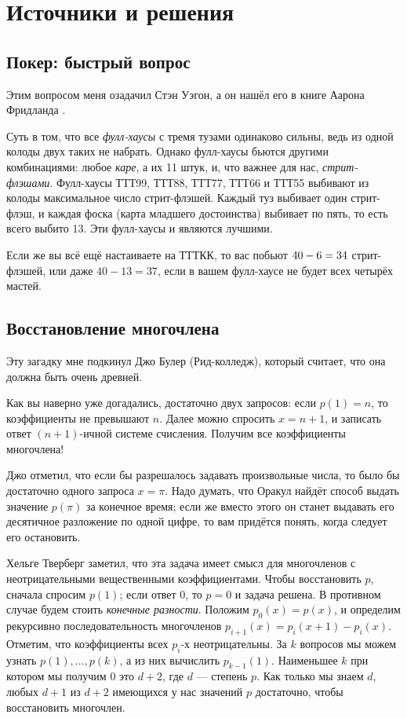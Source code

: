 \section*{Источники и решения}

\subsection*{Покер: быстрый вопрос}

Этим вопросом меня озадачил Стэн Уэгон, а он нашёл его в книге Аарона Фридланда \cite{friedland}.

Суть в том, что все \emph{фулл-хаусы} с тремя тузами одинаково сильны, ведь из одной колоды двух таких не набрать.
Однако фулл-хаусы бьются другими комбинациями: любое \emph{каре}, а их 11 штук, и, что важнее для нас, \emph{стрит-флэшами}.
Фулл-хаусы ТТТ99, ТТТ88, ТТТ77, ТТТ66 и ТТТ55 выбивают из колоды максимальное число стрит-флэшей.
Каждый туз выбивает один стрит-флэш, и каждая фоска (карта младшего достоинства) выбивает по пять, то есть всего выбито 13.
Эти фулл-хаусы и являются лучшими.

Если же вы всё ещё настаиваете на ТТТКК, то вас побьют $40 - 6 \z= 34$ стрит-флэшей, или даже $40 - 13 = 37$, если в вашем фулл-хаусе не будет всех четырёх мастей.

\subsection*{Восстановление многочлена}

Эту загадку мне подкинул Джо Булер (Рид-колледж), который считает, что она должна быть очень древней.

Как вы наверно уже догадались, достаточно двух запросов:
если $p(1)=n$, то коэффициенты не превышают $n$.
Далее можно спросить $x = n + 1$, и записать ответ $(n + 1)$-ичной системе счисления.
Получим все коэффициенты многочлена!

Джо отметил, что если бы разрешалось задавать произвольные числа, то было бы достаточно одного запроса $x = \pi$.
Надо думать, что Оракул найдёт способ выдать значение $p(\pi)$ за конечное время;
если же вместо этого он станет выдавать его десятичное разложение по одной цифре,
то вам придётся понять, когда следует его остановить.

Хельге Тверберг заметил, что эта задача имеет смысл для многочленов с неотрицательными вещественными коэффициентами.
Чтобы восстановить $p$, сначала спросим $p(1)$; если ответ $0$, то $p = 0$ и задача решена.
В противном случае будем стоить \emph{конечные разности}.
Положим $p_0(x) = p(x)$, и определим рекурсивно последовательность многочленов $p_{i+1}(x) = p_i (x+1) - p_i(x)$.
Отметим, что коэффициенты всех $p_i$-х неотрицательны.
За $k$ вопросов мы можем узнать $p(1),\dots,p(k)$,
а из них вычислить $p_{k-1}(1)$.
Наименьшее $k$ при котором мы получим $0$ это $d+2$, где $d$ --- степень $p$.
Как только мы знаем $d$, любых $d+1$ из $d+2$ имеющихся у нас значений $p$ достаточно, чтобы восстановить многочлен.

